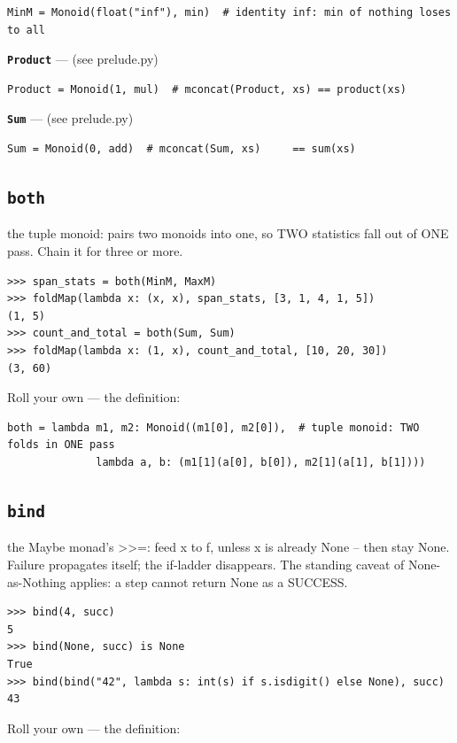 \documentclass[10pt,letterpaper]{book}
\begin{document}
\begin{lstlisting}[style=ex]
MinM = Monoid(float("inf"), min)  # identity inf: min of nothing loses to all
\end{lstlisting}
\textbf{\texttt{Product}}\label{def:Product} --- (see prelude.py)

\begin{lstlisting}[style=ex]
Product = Monoid(1, mul)  # mconcat(Product, xs) == product(xs)
\end{lstlisting}
\textbf{\texttt{Sum}}\label{def:Sum} --- (see prelude.py)

\begin{lstlisting}[style=ex]
Sum = Monoid(0, add)  # mconcat(Sum, xs)     == sum(xs)
\end{lstlisting}
\subsection{\texttt{both}}\label{def:both}
the tuple monoid: pairs two monoids into one, so TWO statistics fall out of ONE pass. Chain it for three or more.
\begin{lstlisting}[style=ex]
>>> span_stats = both(MinM, MaxM)
>>> foldMap(lambda x: (x, x), span_stats, [3, 1, 4, 1, 5])
(1, 5)
>>> count_and_total = both(Sum, Sum)
>>> foldMap(lambda x: (1, x), count_and_total, [10, 20, 30])
(3, 60)
\end{lstlisting}

Roll your own --- the definition:

\begin{lstlisting}[style=ex]
both = lambda m1, m2: Monoid((m1[0], m2[0]),  # tuple monoid: TWO folds in ONE pass
              lambda a, b: (m1[1](a[0], b[0]), m2[1](a[1], b[1])))
\end{lstlisting}
\subsection{\texttt{bind}}\label{def:bind}
the Maybe monad's >>=: feed x to f, unless x is already None -- then stay None. Failure propagates itself; the if-ladder disappears. The standing caveat of None-as-Nothing applies: a step cannot return None as a SUCCESS.
\begin{lstlisting}[style=ex]
>>> bind(4, succ)
5
>>> bind(None, succ) is None
True
>>> bind(bind("42", lambda s: int(s) if s.isdigit() else None), succ)
43
\end{lstlisting}

Roll your own --- the definition:
\end{document}

